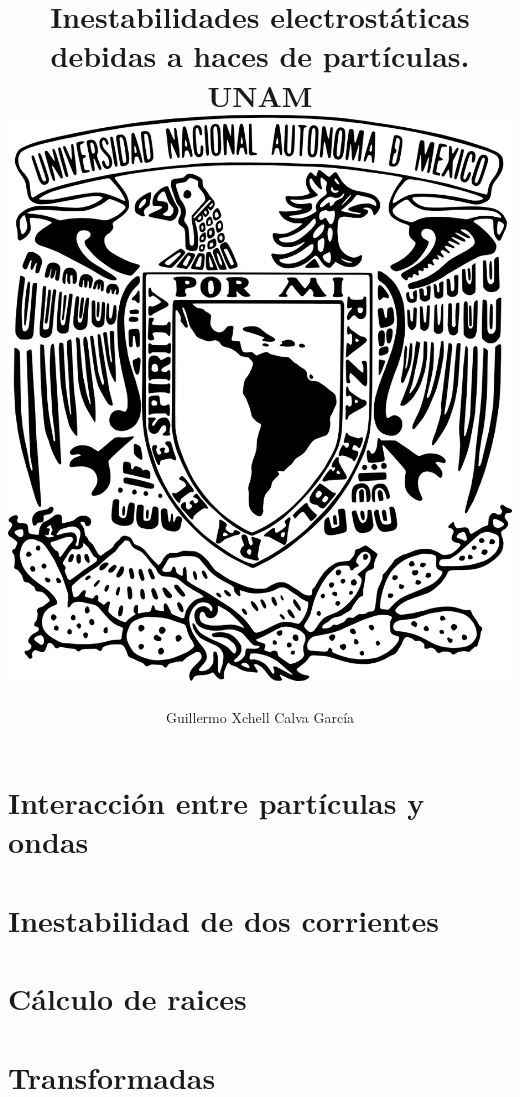 \documentclass[12pt,letterpaper]{report}
\title{
	{Inestabilidades electrostáticas debidas a haces de partículas.}\\
	{\large UNAM}\\
	{\includegraphics{Escudo-UNAM-transparente.png}}
}
\author{Guillermo Xchell Calva García}
\date{}
\newcommand{\onlyinsubfile}[1]{#1}
\newcommand{\notinsubfile}[1]{}
\begin{document}
\renewcommand{\onlyinsubfile}[1]{}
\renewcommand{\notinsubfile}[1]{#1}
\maketitle
%
%
%

\tableofcontents
\listoffigures
{}
\selectfont
\chapter{Interacción entre partículas y ondas}

\chapter{Inestabilidad de dos corrientes}


\appendix
\chapter{Cálculo de raices}
\label{Ap:raices}
\chapter{Transformadas}
\label{Ap:transformadas}

\cleardoublepage{}
{}


\end{document}
